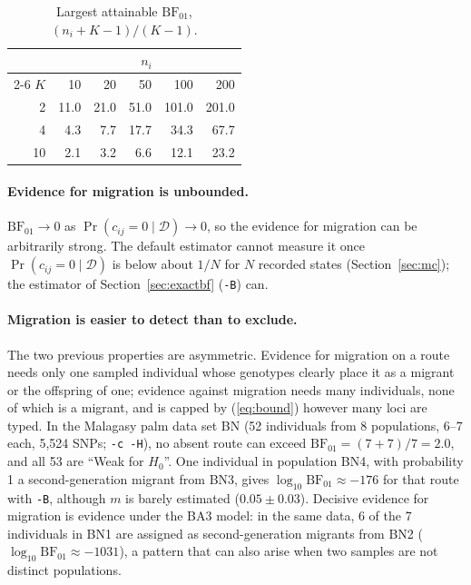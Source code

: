 \documentclass[11pt,a4paper]{article}
\newcommand{\BF}{\mathrm{BF}}
\newcommand{\data}{\mathcal{D}}
\newcommand{\1}{\mathbf{1}}
\begin{document}
\begin{table}[h]
\centering
\begin{tabular}{rrrrrr}
\toprule
& \multicolumn{5}{c}{$n_i$} \\
\cmidrule(l){2-6}
$K$ & 10 & 20 & 50 & 100 & 200 \\
\midrule
2  & 11.0 & 21.0 & 51.0 & 101.0 & 201.0 \\
4  & 4.3  & 7.7  & 17.7 & 34.3  & 67.7 \\
10 & 2.1  & 3.2  & 6.6  & 12.1  & 23.2 \\
\bottomrule
\end{tabular}
\caption{Largest attainable $\BF_{01}$, $(n_i+K-1)/(K-1)$.}
\label{tab:bound}
\end{table}

\paragraph{Evidence for migration is unbounded.}
$\BF_{01}\to 0$ as $\Pr(c_{ij}=0\mid\data)\to 0$, so the evidence for
migration can be arbitrarily strong. The default estimator cannot measure it
once $\Pr(c_{ij}=0\mid\data)$ is below about $1/N$ for $N$ recorded states
(Section~\ref{sec:mc}); the estimator of Section~\ref{sec:exactbf}
(\texttt{-B}) can.

\paragraph{Migration is easier to detect than to exclude.}
The two previous properties are asymmetric. Evidence for migration on a route
needs only one sampled individual whose genotypes clearly place it as a migrant
or the offspring of one; evidence against migration needs many individuals, none
of which is a migrant, and is capped by (\ref{eq:bound}) however many loci are
typed. In the Malagasy palm data set BN (52 individuals from 8 populations,
6--7 each, 5,524 SNPs; \texttt{-c -H}), no absent route can exceed
$\BF_{01}=(7+7)/7=2.0$, and all 53 are ``Weak for $H_0$''. One individual in
population BN4, with probability 1 a second-generation migrant from BN3, gives
$\log_{10}\BF_{01}\approx -176$ for that route with \texttt{-B}, although $m$ is
barely estimated ($0.05\pm0.03$). Decisive evidence for migration is evidence
under the BA3 model: in the same data, 6 of the 7 individuals in BN1 are
assigned as second-generation migrants from BN2 ($\log_{10}\BF_{01}\approx
-1031$), a pattern that can also arise when two samples are not distinct
populations.
\end{document}
